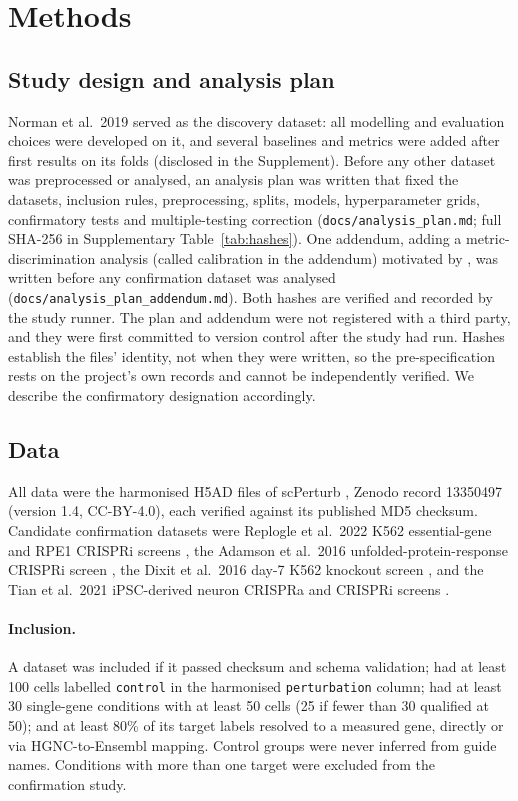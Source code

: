 \section{Methods}

\subsection{Study design and analysis plan}
Norman et al.\ 2019 \citep{norman2019} served as the discovery dataset: all modelling and evaluation choices were developed on it, and several baselines and metrics were added after first results on its folds (disclosed in the Supplement). Before any other dataset was preprocessed or analysed, an analysis plan was written that fixed the datasets, inclusion rules, preprocessing, splits, models, hyperparameter grids, confirmatory tests and multiple-testing correction (\texttt{docs/analysis\_plan.md}; full SHA-256 in Supplementary Table~\ref{tab:hashes}). One addendum, adding a metric-discrimination analysis (called calibration in the addendum) motivated by \citet{miller2026}, was written before any confirmation dataset was analysed (\texttt{docs/analysis\_plan\_addendum.md}). Both hashes are verified and recorded by the study runner. The plan and addendum were not registered with a third party, and they were first committed to version control after the study had run. Hashes establish the files' identity, not when they were written, so the pre-specification rests on the project's own records and cannot be independently verified. We describe the confirmatory designation accordingly.

\subsection{Data}
All data were the harmonised H5AD files of scPerturb \citep{peidli2024}, Zenodo record 13350497 (version 1.4, CC-BY-4.0), each verified against its published MD5 checksum. Candidate confirmation datasets were Replogle et al.\ 2022 K562 essential-gene and RPE1 CRISPRi screens \citep{replogle2022}, the Adamson et al.\ 2016 unfolded-protein-response CRISPRi screen \citep{adamson2016}, the Dixit et al.\ 2016 day-7 K562 knockout screen \citep{dixit2016}, and the Tian et al.\ 2021 iPSC-derived neuron CRISPRa and CRISPRi screens \citep{tian2021}.

\paragraph{Inclusion.} A dataset was included if it passed checksum and schema validation; had at least 100 cells labelled \texttt{control} in the harmonised \texttt{perturbation} column; had at least 30 single-gene conditions with at least 50 cells (25 if fewer than 30 qualified at 50); and at least 80\% of its target labels resolved to a measured gene, directly or via HGNC-to-Ensembl mapping. Control groups were never inferred from guide names. Conditions with more than one target were excluded from the confirmation study.

